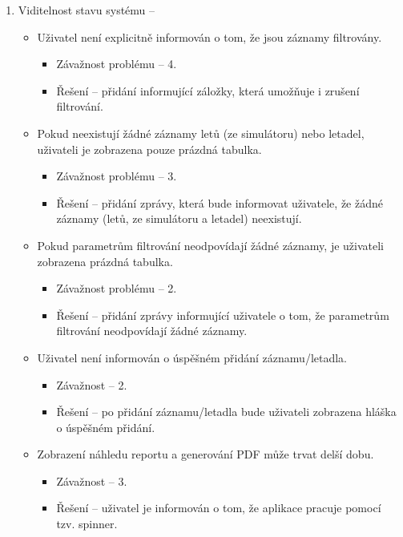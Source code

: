 \documentclass[thesis=M,czech]{FITthesis}[2012/06/26]
\begin{document}
\begin{enumerate}

\item Viditelnost stavu systému -- 
\begin{itemize}
	\item Uživatel není explicitně informován o tom, že jsou záznamy filtrovány.
 	\begin{itemize}
 		\item Závažnost problému -- 4.
 		\item Řešení -- přidání informující záložky, která umožňuje i zrušení filtrování.
 	\end{itemize}
 	\item Pokud neexistují žádné záznamy letů (ze simulátoru) nebo letadel, uživateli je zobrazena pouze prázdná tabulka.
 	\begin{itemize}
 		\item Závažnost problému -- 3.
 		\item Řešení -- přidání zprávy, která bude informovat uživatele, že žádné záznamy (letů, ze simulátoru a letadel) neexistují.
 	\end{itemize}
 	\item Pokud parametrům filtrování neodpovídají žádné záznamy, je uživateli zobrazena prázdná tabulka.
 	\begin{itemize}
 		\item Závažnost problému -- 2.
 		\item Řešení -- přidání zprávy informující uživatele o tom, že parametrům filtrování neodpovídají žádné záznamy. 	
 	\end{itemize}
 	\item Uživatel není informován o úspěšném přidání záznamu/letadla.
 	\begin{itemize}
 		\item Závažnost -- 2.
 		\item Řešení -- po přidání záznamu/letadla bude uživateli zobrazena hláška o úspěšném přidání.
 	\end{itemize}
 	\item Zobrazení náhledu reportu a generování PDF může trvat delší dobu.
 	\begin{itemize}
 		\item Závažnost -- 3.
 		\item Řešení -- uživatel je informován o tom, že aplikace pracuje pomocí tzv. spinner. 
 	\end{itemize}
\end{itemize}
 

\end{enumerate}
\end{document}
